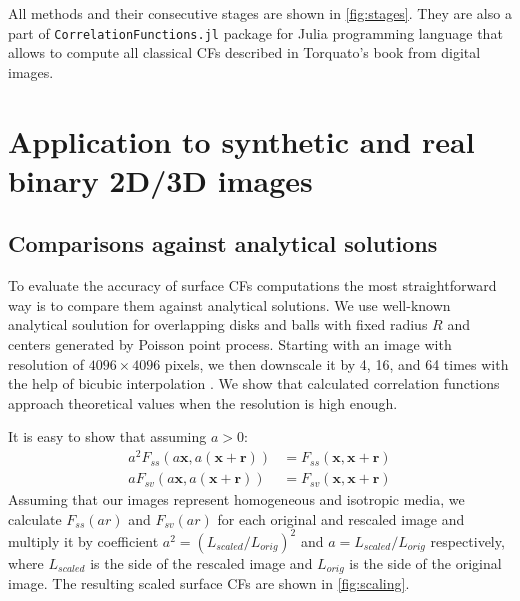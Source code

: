 \documentclass[reprint,amsmath,amssymb,aps,pre,showkeys,showpacs]{revtex4-1}
\newcommand{\code}[1]{\colorbox{light-gray}{\texttt{#1}}}
\begin{document}
All methods and their consecutive stages are shown in \cref{fig:stages}. They
are also a part of \code{CorrelationFunctions.jl} package \cite{CFsjlpaper} for
Julia programming language that allows to compute all classical CFs described in
Torquato’s book \cite{Torquato_book} from digital images.

\section{Application to synthetic and real binary 2D/3D images}
\label{sec:results}
\subsection{Comparisons against analytical solutions}
\label{sec:comparison}
To evaluate the accuracy of surface CFs computations the most straightforward
way is to compare them against analytical solutions. We use well-known
analytical soulution for overlapping disks and balls with fixed radius $R$ and
centers generated by Poisson point process. Starting with an image with
resolution of $4096 \times 4096$ pixels, we then downscale it by 4, 16, and 64
times with the help of bicubic interpolation \cite{ledesma2018effect}. We show
that calculated correlation functions approach theoretical values when the
resolution is high enough.

It is easy to show that assuming $a > 0$:
\begin{align}
  a^2 F_{ss}(a \mathbf{x}, a(\mathbf{x} + \mathbf{r})) &= F_{ss}(\mathbf{x},
  \mathbf{x} + \mathbf{r}) \label{eq:scale-ss} \\
  a F_{sv}(a \mathbf{x}, a(\mathbf{x} + \mathbf{r})) &= F_{sv}(\mathbf{x},
  \mathbf{x} + \mathbf{r}) \label{eq:scale-sv}
\end{align}
Assuming that our images represent homogeneous and isotropic media, we calculate
$F_{ss}(ar)$ and $F_{sv}(ar)$ for each original and rescaled image and multiply
it by coefficient $a^2 = (L_{scaled}/L_{orig})^2$ and $a = L_{scaled}/L_{orig}$
respectively, where $L_{scaled}$ is the side of the rescaled image and
$L_{orig}$ is the side of the original image. The resulting scaled surface CFs
are shown in \cref{fig:scaling}.
\end{document}
